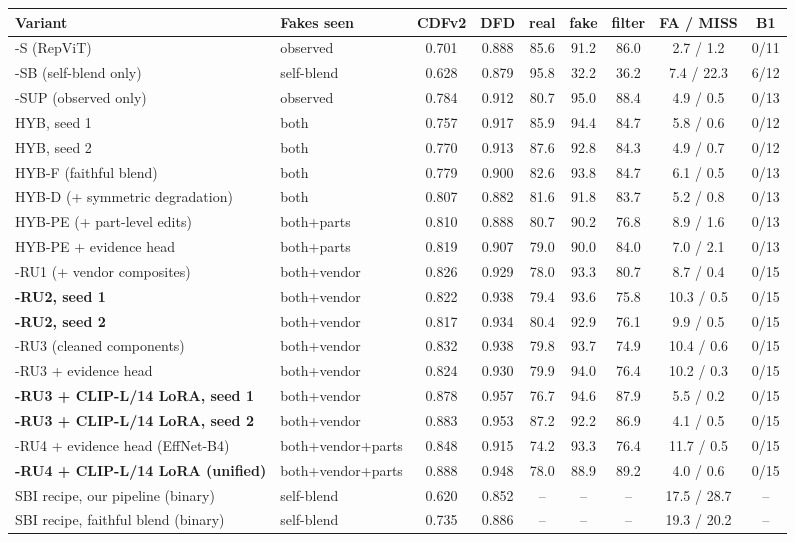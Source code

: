 \begin{tabular}{llccccccc}
\toprule
Variant & Fakes seen & CDFv2 & DFD & real & fake & filter & FA / MISS & B1 \\
\midrule
\ours{}-S (RepViT) & observed & 0.701 & 0.888 & 85.6 & 91.2 & 86.0 & 2.7 / 1.2 & 0/11 \\
\ours{}-SB (self-blend only) & self-blend & 0.628 & 0.879 & 95.8 & 32.2 & 36.2 & 7.4 / 22.3 & 6/12 \\
\ours{}-SUP (observed only) & observed & 0.784 & 0.912 & 80.7 & 95.0 & 88.4 & 4.9 / 0.5 & 0/13 \\
\ours{} HYB, seed 1 & both & 0.757 & 0.917 & 85.9 & 94.4 & 84.7 & 5.8 / 0.6 & 0/12 \\
\ours{} HYB, seed 2 & both & 0.770 & 0.913 & 87.6 & 92.8 & 84.3 & 4.9 / 0.7 & 0/12 \\
\ours{} HYB-F (faithful blend) & both & 0.779 & 0.900 & 82.6 & 93.8 & 84.7 & 6.1 / 0.5 & 0/13 \\
\ours{} HYB-D (+ symmetric degradation) & both & 0.807 & 0.882 & 81.6 & 91.8 & 83.7 & 5.2 / 0.8 & 0/13 \\
\ours{} HYB-PE (+ part-level edits) & both+parts & 0.810 & 0.888 & 80.7 & 90.2 & 76.8 & 8.9 / 1.6 & 0/13 \\
\ours{} HYB-PE + evidence head & both+parts & 0.819 & 0.907 & 79.0 & 90.0 & 84.0 & 7.0 / 2.1 & 0/13 \\
\ours{}-RU1 (+ vendor composites) & both+vendor & 0.826 & 0.929 & 78.0 & 93.3 & 80.7 & 8.7 / 0.4 & 0/15 \\
\textbf{\ours{}-RU2, seed 1} & both+vendor & 0.822 & 0.938 & 79.4 & 93.6 & 75.8 & 10.3 / 0.5 & 0/15 \\
\textbf{\ours{}-RU2, seed 2} & both+vendor & 0.817 & 0.934 & 80.4 & 92.9 & 76.1 & 9.9 / 0.5 & 0/15 \\
\ours{}-RU3 (cleaned components) & both+vendor & 0.832 & 0.938 & 79.8 & 93.7 & 74.9 & 10.4 / 0.6 & 0/15 \\
\ours{}-RU3 + evidence head & both+vendor & 0.824 & 0.930 & 79.9 & 94.0 & 76.4 & 10.2 / 0.3 & 0/15 \\
\textbf{\ours{}-RU3 + CLIP-L/14 LoRA, seed 1} & both+vendor & 0.878 & 0.957 & 76.7 & 94.6 & 87.9 & 5.5 / 0.2 & 0/15 \\
\textbf{\ours{}-RU3 + CLIP-L/14 LoRA, seed 2} & both+vendor & 0.883 & 0.953 & 87.2 & 92.2 & 86.9 & 4.1 / 0.5 & 0/15 \\
\ours{}-RU4 + evidence head (EffNet-B4) & both+vendor+parts & 0.848 & 0.915 & 74.2 & 93.3 & 76.4 & 11.7 / 0.5 & 0/15 \\
\textbf{\ours{}-RU4 + CLIP-L/14 LoRA (unified)} & both+vendor+parts & 0.888 & 0.948 & 78.0 & 88.9 & 89.2 & 4.0 / 0.6 & 0/15 \\
\midrule
SBI recipe, our pipeline (binary) & self-blend & 0.620 & 0.852 & -- & -- & -- & 17.5 / 28.7 & -- \\
SBI recipe, faithful blend (binary) & self-blend & 0.735 & 0.886 & -- & -- & -- & 19.3 / 20.2 & -- \\
\bottomrule
\end{tabular}
